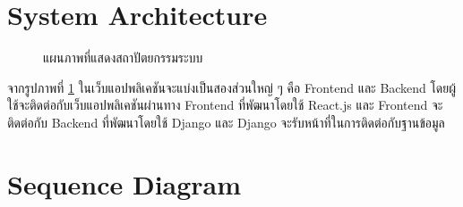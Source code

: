 \documentclass[12pt,oneside,openright,a4paper]{cpe-thai-project}
\begin{document}
\pagebreak
\section{System Architecture}

\begin{figure}[!h]\centering
	\caption{แผนภาพที่แสดงสถาปัตยกรรมระบบ}\label{fig:SystemArchitecture}
\end{figure}

\hspace{1cm}
จากรูปภาพที่ \ref{fig:SystemArchitecture} ในเว็บแอปพลิเคชันจะแบ่งเป็นสองส่วนใหญ่ ๆ คือ Frontend และ Backend โดยผู้ใช้จะติดต่อกับเว็บแอปพลิเคชันผ่านทาง
Frontend ที่พัฒนาโดยใช้ React.js และ Frontend จะติดต่อกับ Backend ที่พัฒนาโดยใช้ Django และ Django
จะรับหน้าที่ในการติดต่อกับฐานข้อมูล

\pagebreak
\section{Sequence Diagram}
\end{document}
